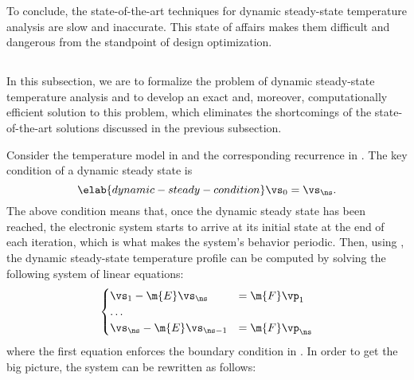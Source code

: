 To conclude, the state-of-the-art techniques for dynamic steady-state
temperature analysis are slow and inaccurate. This state of affairs makes them
difficult and dangerous from the standpoint of design optimization.

\subsection{\solutiontitle}

In this subsection, we are to formalize the problem of dynamic steady-state
temperature analysis and to develop an exact and, moreover, computationally
efficient solution to this problem, which eliminates the shortcomings of the
state-of-the-art solutions discussed in the previous subsection.

Consider the temperature model in  and the corresponding
recurrence in . The key condition of a dynamic steady
state is
\begin{equation} \elab{dynamic-steady-condition}
  \vs_0 = \vs_\ns.
\end{equation}
The above condition means that, once the dynamic steady state has been reached,
the electronic system starts to arrive at its initial state at the end of each
iteration, which is what makes the system's behavior periodic. Then, using
, the dynamic steady-state temperature profile can be
computed by solving the following system of linear equations:
\[
  \begin{cases}
    \vs_1 - \m{E} \vs_\ns & = \m{F} \vp_1 \\
    \dots \\
    \vs_\ns - \m{E} \vs_{\ns - 1} & = \m{F} \vp_\ns
  \end{cases}
\]
where the first equation enforces the boundary condition in
. In order to get the big picture, the system can
be rewritten as follows:

